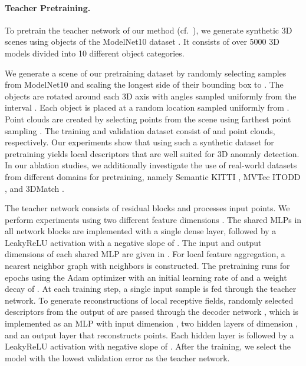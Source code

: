 \documentclass[twoside,11pt]{article}
\begin{document}
\paragraph{\textbf{Teacher Pretraining.}}
To pretrain the teacher network of our method (cf.\ ), we generate synthetic 3D scenes using objects of the ModelNet10 dataset \citep{wu20153d_modelnet10}. It consists of over 5000 3D models divided into 10 different object categories. 

We generate a scene of our pretraining dataset by randomly selecting  samples from ModelNet10 and scaling the longest side of their bounding box to . The objects are rotated around each 3D axis with angles sampled uniformly from the interval . Each object is placed at a random location sampled uniformly from . Point clouds are created by selecting  points from the scene using farthest point sampling  \citep{moenning2003_farthest_point_sampling}. The training and validation dataset consist of  and  point clouds, respectively.
Our experiments show that using such a synthetic dataset for pretraining yields local descriptors that are well suited for 3D anomaly detection. In our ablation studies, we additionally investigate the use of real-world datasets from different domains for pretraining, namely Semantic KITTI \citep{Behley_2019_semantic_kitti,geiger2012cvpr}, MVTec ITODD \citep{Drost2017Itodd}, and 3DMatch \citep{Zeng_2017_3DMatch}.

The teacher network  consists of  residual blocks and processes  input points. We perform experiments using two different feature dimensions . The shared MLPs in all network blocks are implemented with a single dense layer, followed by a LeakyReLU activation with a negative slope of . The input and output dimensions of each shared MLP are given in . For local feature aggregation, a nearest neighbor graph with  neighbors is constructed. The pretraining runs for  epochs using the Adam optimizer with an initial learning rate of  and a weight decay of . At each training step, a single input sample is fed through the teacher network. To generate reconstructions of local receptive fields,  randomly selected descriptors from the output of  are passed through the decoder network , which is implemented as an MLP with input dimension , two hidden layers of dimension , and an output layer that reconstructs  points. Each hidden layer is followed by a LeakyReLU activation with negative slope of . After the training, we select the model with the lowest validation error as the teacher network.
\end{document}
